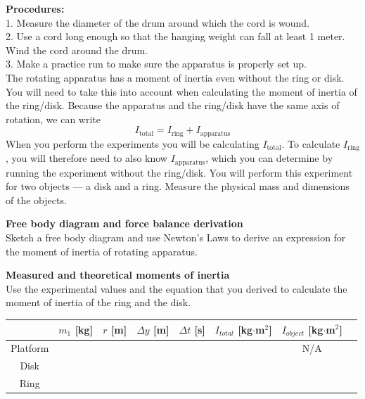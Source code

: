 \documentclass[11pt,letterpaper]{article}
\begin{document}
{\bf Procedures:}\\  
1.  Measure the diameter of the drum around which
the cord is wound.\\
2.  Use a cord long enough so that the hanging weight can fall at least
1 meter.  Wind the cord around the drum.\\
3.  Make a practice run to make sure the apparatus is properly
set up.\\

The rotating apparatus has a moment of inertia even without the ring or disk. You will need to take this into account when calculating the moment of inertia of the ring/disk. Because the apparatus and the ring/disk have the same axis of rotation, we can write
$$I_{\mbox{total}}=I_{\mbox{ring}}+I_{\mbox{apparatus}}$$
When you perform the experiments you will be calculating $I_{\mbox{total}}$. To calculate $I_{\mbox{ring}}$, you will therefore need to also know $I_{\mbox{apparatus}}$, which you can determine by running the experiment without the ring/disk. You will perform this experiment for two objects --- a disk and a ring.  Measure the physical mass and dimensions of the objects.\bigskip

{\bf Free body diagram and force balance derivation}\\
Sketch a free body diagram and use Newton's Laws to derive an expression for the moment of inertia of rotating apparatus.

\clearpage
{\bf Measured and theoretical moments of inertia}\\
Use the experimental values and the equation that you derived to calculate
the moment of inertia of the ring and the disk.


\renewcommand{\arraystretch}{1.4}
\begin{table}[h!]
\begin{tabular}{|c|c|c|c|c|c|c|c|}
\hline
& $m_1$ [kg] & $r$ [m] & $\Delta y$ [m] & $\Delta t$ [s] & $I_{total}$ [kg$\cdot$m$^2$] & $I_{object}$ [kg$\cdot$m$^2$]\\
\hline Platform & \hspace{1.5cm} & \hspace{1.5cm} & \hspace{1.5cm} & \hspace{1.5cm} & \hspace{1.5cm} & N/A\\
\hline Disk & & & & & & \\
\hline Ring & & & & & & \\
\hline
\end{tabular}
\end{table}
\end{document}
